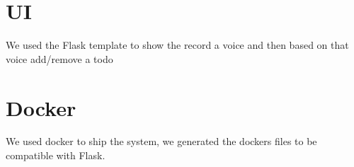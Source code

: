 \documentclass[fleqn,10pt]{SelfArx} %
\begin{document}
\section{UI}

We used the Flask template to show the record a voice and then based on that voice add/remove a todo    

\section{Docker}
We used docker to ship the system, we generated the dockers files to be compatible with Flask.

\end{document}
